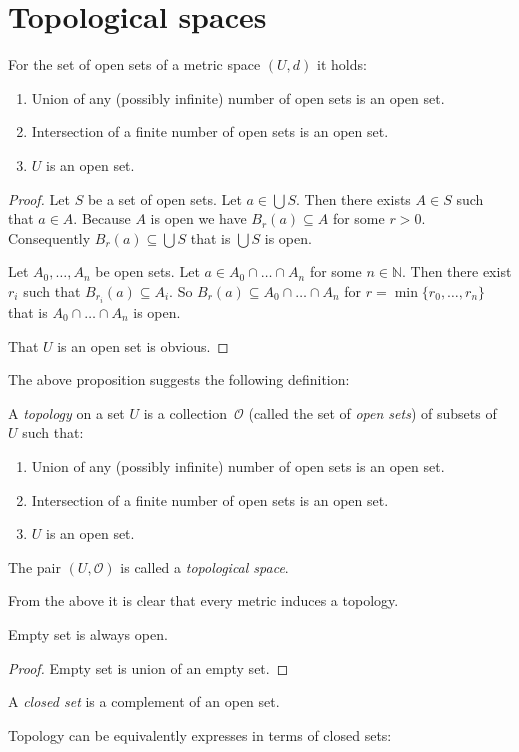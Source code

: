 \section{\label{sec-top}Topological spaces}
\begin{prop}
For the set of open sets of a metric space $(U,d)$ it holds:
\begin{enumerate}
\item Union of any (possibly infinite) number of open sets is an open set.
\item Intersection of a finite number of open sets is an open set.
\item $U$ is an open set.
\end{enumerate}
\end{prop}
\begin{proof}
Let $S$ be a set of open sets. Let $a\in\bigcup S$. Then there exists
$A\in S$ such that $a\in A$. Because $A$ is open we have $B_{r}(a)\subseteq A$
for some $r>0$. Consequently $B_{r}(a)\subseteq\bigcup S$ that is
$\bigcup S$ is open.

Let $A_{0},\dots,A_{n}$ be open sets. Let $a\in A_{0}\cap\dots\cap A_{n}$
for some $n\in\mathbb{N}$. Then there exist $r_{i}$ such that $B_{r_{i}}(a)\subseteq A_{i}$.
So $B_{r}(a)\subseteq A_{0}\cap\dots\cap A_{n}$ for $r=\min\{r_{0},\dots,r_{n}\}$
that is $A_{0}\cap\dots\cap A_{n}$ is open.

That $U$ is an open set is obvious.
\end{proof}
The above proposition suggests the following definition:
\begin{defn}
A \emph{topology} on a set $U$ is a collection~$\mathcal{O}$
(called the set of \emph{open sets}) of subsets of~$U$ such that:
\begin{enumerate}
\item Union of any (possibly infinite) number of open sets is an open set.
\item Intersection of a finite number of open sets is an open set.
\item $U$ is an open set.
\end{enumerate}
The pair $(U,\mathcal{O})$ is called a
\emph{topological space}.\end{defn}
\begin{rem}
From the above it is clear that every metric induces a topology.\end{rem}
\begin{prop}
Empty set is always open.\end{prop}
\begin{proof}
Empty set is union of an empty set.\end{proof}
\begin{defn}
A \emph{closed set} is a complement of an open
set.
\end{defn}
Topology can be equivalently expresses in terms of closed sets:

